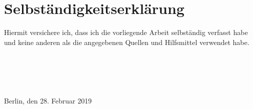 \chapter*{Selbst\"andigkeitserkl\"arung}

Hiermit versichere ich, dass ich die vorliegende Arbeit selbständig verfasst habe und keine anderen als die angegebenen Quellen und Hilfsmittel verwendet habe.\\ \\ \\ \\ \\ \\

Berlin, den 28. Februar 2019
